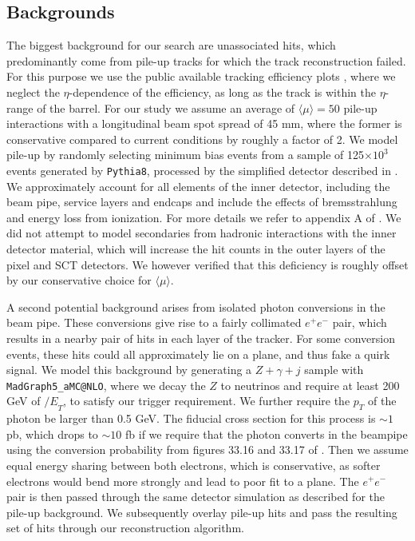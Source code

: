 \documentclass[10pt,aps,prd,nofootinbib,superscriptaddress,twocolumn,preprintnumbers,balancelastpage]{revtex4}
\newcommand{\MET}{{\slash\!\!\!\!E}_{T}}
\begin{document}
\subsection{Backgrounds}

The biggest background for our search are unassociated hits, which predominantly come from pile-up tracks for which the track reconstruction failed. For this purpose we use the public available tracking efficiency plots \cite{ATL-PHYS-PUB-2015-051}, where we neglect the $\eta$-dependence of the efficiency, as long as the track is within the $\eta$-range of the barrel. For our study we assume an average of $\langle \mu\rangle=50$ pile-up interactions with a longitudinal beam spot spread of 45 mm, where the former is conservative compared to current conditions by roughly a factor of 2. We model pile-up by randomly selecting minimum bias events from a sample of 125$\times 10^3$ events generated by \texttt{Pythia8}, processed by the simplified detector described in \cite{Knapen:2016hky}. %
We approximately account for all elements of the inner detector, including the beam pipe, service layers and endcaps and include the effects of bremsstrahlung and energy loss from ionization. For more details we refer to appendix A of \cite{Knapen:2016hky}. We did not attempt to model secondaries from hadronic interactions with the inner detector material, which will increase the hit counts in the outer layers of the pixel and SCT detectors. We however verified that this deficiency is roughly offset by our conservative choice for $\langle \mu\rangle$.

A second potential background arises from isolated photon conversions in the beam pipe. These conversions give rise to a fairly collimated $e^+ e^-$ pair, which results in a nearby pair of hits in each layer of the tracker. For some conversion events, these hits could all approximately lie on a plane, and thus fake a quirk signal. We model this background by generating a $Z+\gamma+j$ sample with \texttt{MadGraph5\_aMC@NLO}, where we decay the $Z$ to neutrinos and require at least 200 GeV of $\MET$, to satisfy our trigger requirement. We further require the $p_T$ of the photon be larger than 0.5 GeV. The fiducial cross section for this process is $\sim 1$ pb, which drops to $\sim 10$ fb if we require that the photon converts in the beampipe using the conversion probability from figures 33.16 and 33.17 of \cite{Olive:2016xmw}. Then we assume equal energy sharing between both electrons, which is conservative, as softer electrons would bend more strongly and lead to poor fit to a plane. The $e^+e^-$ pair is then passed through the same detector simulation as described for the pile-up background. We subsequently overlay pile-up hits and pass the resulting set of hits through our reconstruction algorithm. 
\end{document}
